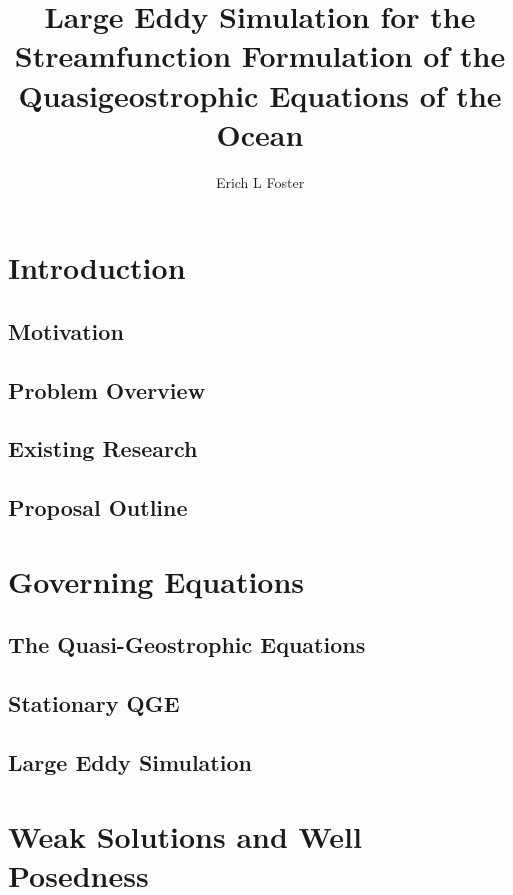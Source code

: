 \documentclass[proposal]{VTthesis}
\title{Large Eddy Simulation for the Streamfunction Formulation of the Quasigeostrophic Equations of the Ocean}
\author{Erich L Foster}
\begin{document}
  \frontmatter
  \maketitle
  \tableofcontents
  \listoftables
  \listoffigures

  \mainmatter

  \chapter{Introduction} \label{ch:Intro}
    \section{Motivation} \label{sec:Motivation}
    
    \section{Problem Overview}
    
    \section{Existing Research}
    
    \section{Proposal Outline}
    
    
  \chapter{Governing Equations} \label{ch:Model}
    \section{The Quasi-Geostrophic Equations} \label{sec:QGE}
    
    \section{Stationary QGE} \label{sec:SQGE}
    
    \section{Large Eddy Simulation} \label{sec:LES}
    
  
  \chapter{Weak Solutions and Well Posedness} \label{ch:WellPosed}
\end{document}
